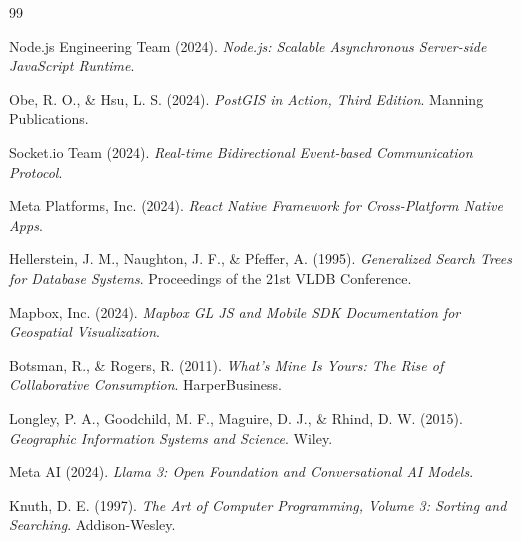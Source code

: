 \documentclass[12pt]{report}
\begin{document}
\tableofcontents
{}
\listoffigures
{}
\listoftables
{}













\cleardoublepage
{}
\renewcommand{\bibname}{References}
\begin{thebibliography}{99}

Node.js Engineering Team (2024). \textit{Node.js: Scalable Asynchronous Server-side JavaScript Runtime}. 

Obe, R. O., \& Hsu, L. S. (2024). \textit{PostGIS in Action, Third Edition}. Manning Publications.

Socket.io Team (2024). \textit{Real-time Bidirectional Event-based Communication Protocol}.

Meta Platforms, Inc. (2024). \textit{React Native Framework for Cross-Platform Native Apps}.

Hellerstein, J. M., Naughton, J. F., \& Pfeffer, A. (1995). \textit{Generalized Search Trees for Database Systems}. Proceedings of the 21st VLDB Conference.

Mapbox, Inc. (2024). \textit{Mapbox GL JS and Mobile SDK Documentation for Geospatial Visualization}.

Botsman, R., \& Rogers, R. (2011). \textit{What's Mine Is Yours: The Rise of Collaborative Consumption}. HarperBusiness.

Longley, P. A., Goodchild, M. F., Maguire, D. J., \& Rhind, D. W. (2015). \textit{Geographic Information Systems and Science}. Wiley.

Meta AI (2024). \textit{Llama 3: Open Foundation and Conversational AI Models}.

Knuth, D. E. (1997). \textit{The Art of Computer Programming, Volume 3: Sorting and Searching}. Addison-Wesley.

\end{thebibliography}
\end{document}
